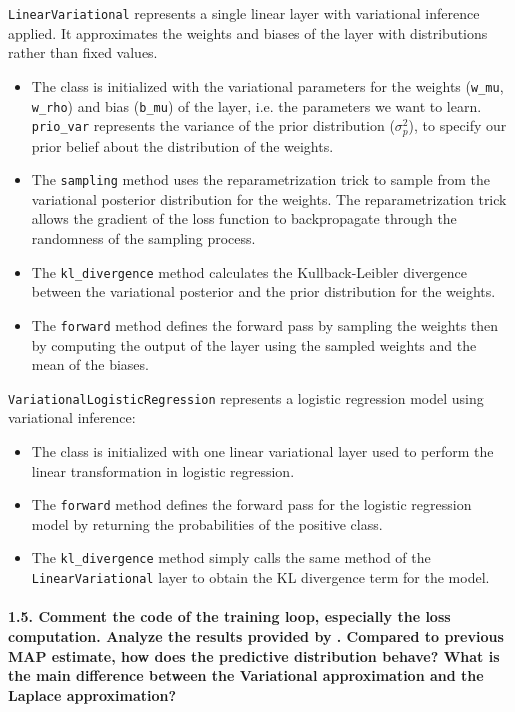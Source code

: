 \noindent\texttt{LinearVariational} represents a single linear layer with variational inference applied. It approximates the weights and biases of the layer with distributions rather than fixed values.
\begin{itemize}
    \item The class is initialized with the variational parameters for the weights (\texttt{w\_mu}, \texttt{w\_rho}) and bias (\texttt{b\_mu}) of the layer, i.e. the parameters we want to learn. \texttt{prio\_var} represents the variance of the prior distribution ($\sigma^2_p$), to specify our prior belief about the distribution of the weights. 
    \item The \texttt{sampling} method uses the reparametrization trick to sample from the variational posterior distribution for the weights. The reparametrization trick allows the gradient of the loss function to backpropagate through the randomness of the sampling process. 
    \item The \texttt{kl\_divergence} method calculates the Kullback-Leibler divergence between the variational posterior and the prior distribution for the weights.
    \item The \texttt{forward} method defines the forward pass by sampling the weights then by computing the output of the layer using the sampled weights and the mean of the biases.
\end{itemize}

\noindent\texttt{VariationalLogisticRegression} represents a logistic regression model using variational inference:
\begin{itemize}
    \item The class is initialized with one linear variational layer used to perform the linear transformation in logistic regression.
    \item The \texttt{forward} method defines the forward pass for the logistic regression model by returning the probabilities of the positive class. 
    \item The \texttt{kl\_divergence} method simply calls the same method of the \texttt{LinearVariational} layer to obtain the KL divergence term for the model.
\end{itemize}

\paragraph{1.5. Comment the code of the training loop, especially the loss computation. Analyze the results provided by . Compared to previous MAP estimate, how does the predictive distribution behave? What is the main difference between the Variational approximation and the Laplace approximation?}

